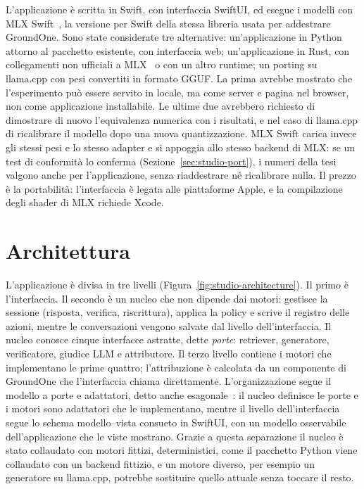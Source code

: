 L'applicazione è scritta in Swift, con interfaccia SwiftUI, ed esegue i modelli con MLX Swift~\cite{apple2026mlxswift,
apple2026mlxswiftlm}, la versione per Swift della stessa libreria usata per addestrare GroundOne. Sono state considerate
tre alternative: un'applicazione in Python attorno al pacchetto esistente, con interfaccia web; un'applicazione in Rust,
con collegamenti non ufficiali a MLX~\cite{oxiglade2026mlxrs} o con un altro runtime; un porting su llama.cpp con pesi
convertiti in formato GGUF. La prima avrebbe mostrato che l'esperimento può essere servito in locale, ma come server e
pagina nel browser, non come applicazione installabile. Le ultime due avrebbero richiesto di dimostrare di nuovo
l'equivalenza numerica con i risultati, e nel caso di llama.cpp di ricalibrare il modello dopo una nuova quantizzazione.
MLX Swift carica invece gli stessi pesi e lo stesso adapter e si appoggia allo stesso backend di MLX: se un test di
conformità lo conferma (Sezione~\ref{sec:studio-port}), i numeri della tesi valgono anche per l'applicazione, senza
riaddestrare né ricalibrare nulla. Il prezzo è la portabilità: l'interfaccia è legata alle piattaforme Apple, e la
compilazione degli shader di MLX richiede Xcode.

\section{Architettura}
\label{sec:studio-architecture}

L'applicazione è divisa in tre livelli (Figura~\ref{fig:studio-architecture}). Il primo è l'interfaccia. Il secondo è un
nucleo che non dipende dai motori: gestisce la sessione (risposta, verifica, riscrittura), applica la policy e scrive il registro delle azioni, mentre le conversazioni vengono salvate dal livello dell'interfaccia. Il nucleo conosce cinque interfacce astratte, dette \emph{porte}: retriever, generatore, verificatore, giudice LLM e attributore. Il terzo livello contiene i motori che implementano le prime quattro; l'attribuzione è calcolata da un componente di GroundOne che l'interfaccia chiama direttamente. L'organizzazione segue il modello a porte e adattatori, detto anche esagonale~\cite{cockburn2005hexagonal}: il nucleo definisce le porte e i motori sono adattatori che le implementano, mentre il livello dell'interfaccia segue lo schema modello--vista consueto in SwiftUI, con un modello osservabile dell'applicazione che le viste mostrano. Grazie a questa
separazione il nucleo è stato collaudato con motori fittizi, deterministici, come il pacchetto Python viene collaudato con
un backend fittizio, e un motore diverso, per esempio un generatore su llama.cpp, potrebbe sostituire quello attuale senza
toccare il resto.

